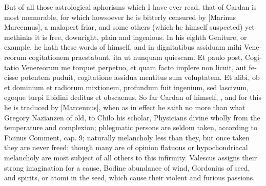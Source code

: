 But of all those astrological aphorisms which I have ever read, that of
Cardan is most memorable, for which howsoever he is bitterly censured
by [Marinus Marcennus], a malapert friar, and some others (which
 he himself suspected) yet methinks it is free, downright, plain
and ingenious. In his eighth Geniture, or example, he hath these
words of himself, \conjunction{} \Venus{} and \Mercury in \Mercury \textlatin{dignitatibus assiduam mihi Venereorum
cogitationem praestabunt, ita ut nunquam quiescam. Et paulo post,
Cogitatio Venereorum me torquet perpetuo, et quam facto implere non
licuit, aut fecisse potentem puduit, cogitatione assidua mentitus sum
voluptatem. Et alibi, ob \leftmoon{} et \Mercury{} dominium et radiorum mixtionem,
profundum fuit ingenium, sed lascivum, egoque turpi libidini deditus et
obscaenus}. So far Cardan of himself,  , and for this he is
traduced by [Marcennus], when as in effect he saith no more than what
Gregory Nazianzen of old, to Chilo his scholar,  Physicians divine wholly from the
temperature and complexion; phlegmatic persons are seldom taken,
according to Ficinus Comment, cap. 9; naturally melancholy less than
they, but once taken they are never freed; though many are of opinion
flatuous or hypochondriacal melancholy are most subject of all others
to this infirmity. Valescus assigns their strong imagination for a
cause, Bodine abundance of wind, Gordonius of seed, and spirits, or
atomi in the seed, which cause their violent and furious passions.
